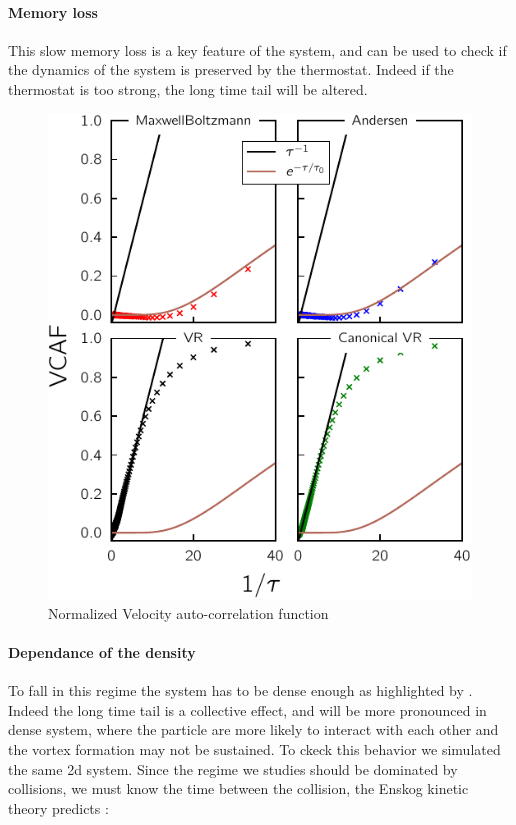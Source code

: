 \documentclass[ansiapaper]{report}
\begin{document}
\begin{multicols}{3}
\paragraph*{Memory loss}
This slow memory loss is a key feature of the system, and can be used to check if the dynamics of the system is preserved by the thermostat. Indeed if the thermostat is too strong, the long time tail will be altered.
\begin{figure}[H]
    \begin{center}
        \includegraphics[width=1\linewidth]{figures/velocity_autocorrelation.pdf}
    \end{center}
    \caption{Normalized Velocity auto-correlation function}\label{fig:VCAF-th}
\end{figure}


\paragraph*{Dependance of the density}

To fall in this regime the system has to be dense enough as highlighted by \cite{density}. Indeed the long time tail is a collective effect, and will be more pronounced in dense system, where the particle are more likely to interact with each other and the vortex formation may not be sustained. To ckeck this behavior we simulated the same 2d system. Since the regime we studies should be dominated by collisions, we must know the time between the collision, the Enskog kinetic theory predicts : 


\end{multicols}
\end{document}
